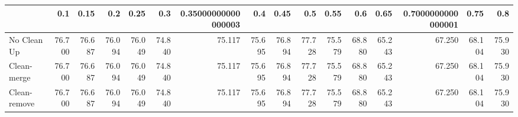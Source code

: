 \begin{tabular}{lrrrrrrrrrrrrrrr}
\toprule
{} &    0.1 &   0.15 &    0.2 &   0.25 &    0.3 & 0.35000000000000003 &    0.4 &   0.45 &    0.5 &   0.55 &    0.6 &   0.65 & 0.7000000000000001 &   0.75 &    0.8 \\
\midrule
No Clean Up  & 76.700 & 76.687 & 76.094 & 76.049 & 74.840 &              75.117 & 75.695 & 76.894 & 77.728 & 75.579 & 68.880 & 65.243 &             67.250 & 68.104 & 75.930 \\
Clean-merge  & 76.700 & 76.687 & 76.094 & 76.049 & 74.840 &              75.117 & 75.695 & 76.894 & 77.728 & 75.579 & 68.880 & 65.243 &             67.250 & 68.104 & 75.930 \\
Clean-remove & 76.700 & 76.687 & 76.094 & 76.049 & 74.840 &              75.117 & 75.695 & 76.894 & 77.728 & 75.579 & 68.880 & 65.243 &             67.250 & 68.104 & 75.930 \\
\bottomrule
\end{tabular}
